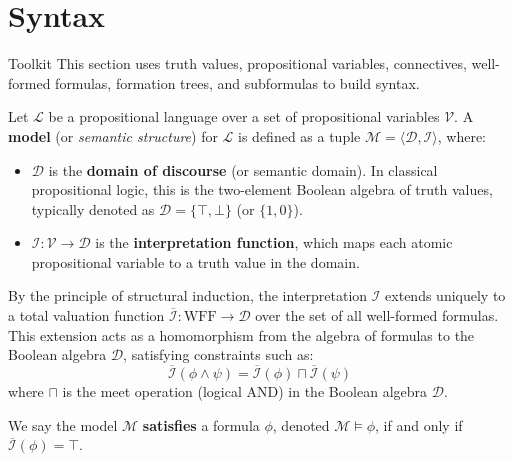 \section{Syntax}

\begin{toolkitbox}{Toolkit}
This section uses truth values, propositional variables, connectives,
well-formed formulas, formation trees, and subformulas to build syntax.
\end{toolkitbox}

\begin{definition}
Let $\mathcal{L}$ be a propositional language over a set of propositional variables $\mathcal{V}$. A \textbf{model} (or \textit{semantic structure}) for $\mathcal{L}$ is defined as a tuple $\mathcal{M} = \langle \mathcal{D}, \mathcal{I} \rangle$, where:
\begin{itemize}
    \item $\mathcal{D}$ is the \textbf{domain of discourse} (or semantic domain). In classical propositional logic, this is the two-element Boolean algebra of truth values, typically denoted as $\mathcal{D} = \{ \top, \bot \}$ (or $\{1, 0\}$).
    \item $\mathcal{I}: \mathcal{V} \to \mathcal{D}$ is the \textbf{interpretation function}, which maps each atomic propositional variable to a truth value in the domain.
\end{itemize}

By the principle of structural induction, the interpretation $\mathcal{I}$ extends uniquely to a total valuation function $\overline{\mathcal{I}}: \text{WFF} \to \mathcal{D}$ over the set of all well-formed formulas. This extension acts as a homomorphism from the algebra of formulas to the Boolean algebra $\mathcal{D}$, satisfying constraints such as:
\[ \overline{\mathcal{I}}(\phi \land \psi) = \overline{\mathcal{I}}(\phi) \sqcap \overline{\mathcal{I}}(\psi) \]
where $\sqcap$ is the meet operation (logical AND) in the Boolean algebra $\mathcal{D}$.

We say the model $\mathcal{M}$ \textbf{satisfies} a formula $\phi$, denoted $\mathcal{M} \models \phi$, if and only if $\overline{\mathcal{I}}(\phi) = \top$.
\end{definition}











